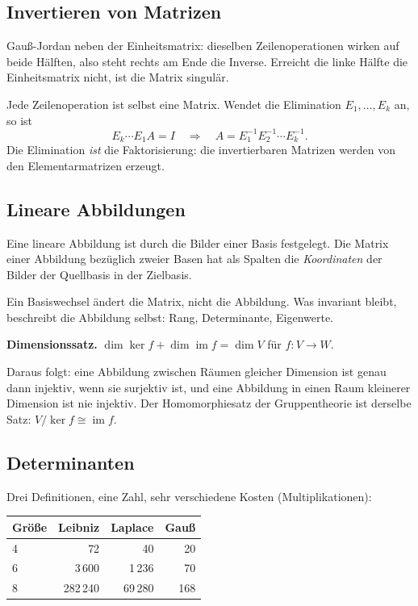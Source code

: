 \documentclass[12pt, a4paper]{article}
\begin{document}
\subsection{Invertieren von Matrizen}

Gauß-Jordan neben der Einheitsmatrix: dieselben Zeilenoperationen wirken auf
beide Hälften, also steht rechts am Ende die Inverse. Erreicht die linke
Hälfte die Einheitsmatrix nicht, ist die Matrix singulär.

Jede Zeilenoperation ist selbst eine Matrix. Wendet die Elimination
$E_1, \dots, E_k$ an, so ist
\[
  E_k \cdots E_1 A = I \quad\Longrightarrow\quad
  A = E_1^{-1} E_2^{-1} \cdots E_k^{-1}.
\]
Die Elimination \emph{ist} die Faktorisierung: die invertierbaren Matrizen
werden von den Elementarmatrizen erzeugt.

\subsection{Lineare Abbildungen}

\begin{definitionbox}
Eine lineare Abbildung ist durch die Bilder einer Basis festgelegt. Die
Matrix einer Abbildung bezüglich zweier Basen hat als Spalten die
\emph{Koordinaten} der Bilder der Quellbasis in der Zielbasis.
\end{definitionbox}

Ein Basiswechsel ändert die Matrix, nicht die Abbildung. Was invariant
bleibt, beschreibt die Abbildung selbst: Rang, Determinante, Eigenwerte.

\begin{definitionbox}
\textbf{Dimensionssatz.} $\dim \ker f + \dim \operatorname{im} f =
\dim V$ für $f: V \to W$.
\end{definitionbox}

Daraus folgt: eine Abbildung zwischen Räumen gleicher Dimension ist genau
dann injektiv, wenn sie surjektiv ist, und eine Abbildung in einen Raum
kleinerer Dimension ist nie injektiv. Der Homomorphiesatz der Gruppentheorie
ist derselbe Satz: $V/\ker f \cong \operatorname{im} f$.

\subsection{Determinanten}

Drei Definitionen, eine Zahl, sehr verschiedene Kosten (Multiplikationen):

\begin{center}
\begin{tabular}{lrrr}
\toprule
Größe & Leibniz & Laplace & Gauß\\
\midrule
4 & 72 & 40 & 20\\
6 & 3\,600 & 1\,236 & 70\\
8 & 282\,240 & 69\,280 & 168\\
\bottomrule
\end{tabular}
\end{center}
\end{document}
